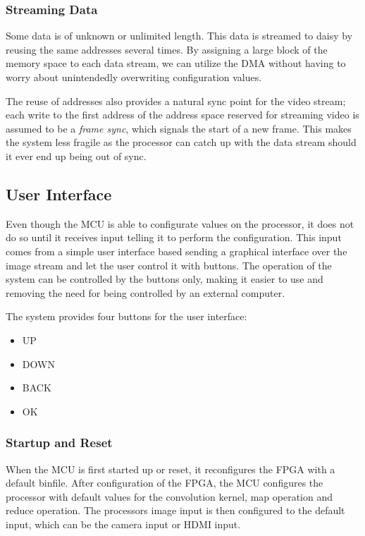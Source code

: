 \subsubsection{Streaming Data}
Some data is of unknown or unlimited length. This data is streamed to daisy by reusing the same addresses several times.
By assigning a large block of the memory space to each data stream, we can utilize the DMA without having to worry about unintendedly overwriting configuration values.

The reuse of addresses also provides a natural sync point for the video stream;
each write to the first address of the address space reserved for streaming video is assumed to be a \textit{frame sync}, which signals the start of a new frame.
This makes the system less fragile as the processor can catch up with the data stream should it ever end up being out of sync.

\subsection{User Interface}
Even though the MCU is able to configurate values on the processor, it does not do so until it receives input telling it to perform the configuration. This input comes from a simple user interface based sending a graphical interface over the image stream and let the user control it with buttons. The operation of the system can be controlled by the buttons only, making it easier to use and removing the need for being controlled by an external computer. 

The system provides four buttons for the user interface:
\begin{itemize}
	\item UP
	\item DOWN
	\item BACK
	\item OK
\end{itemize}

\subsubsection{Startup and Reset}
When the MCU is first started up or reset, it reconfigures the FPGA with a default binfile. After configuration of the FPGA, the MCU configures the processor with default values for the convolution kernel, map operation and reduce operation. The processors image input is then configured to the default input, which can be the camera input or HDMI input.

